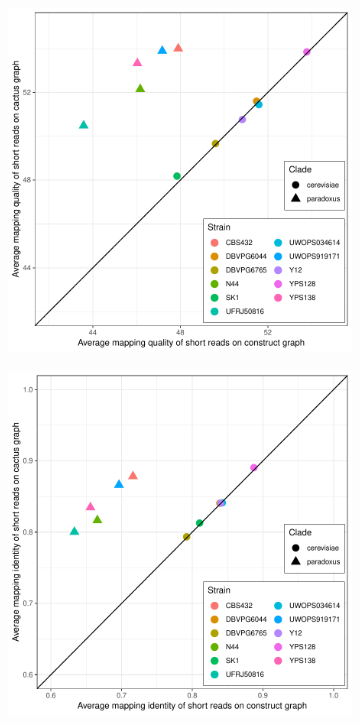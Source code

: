 \documentclass{article}
\begin{document}
\clearpage
\begin{figure}
  \begin{subfigure}[b]{.5\textwidth}
    \caption{}
    \includegraphics[width=\textwidth]{pdf/yeast-genotyping-quality.pdf}
  \end{subfigure}
  \begin{subfigure}[b]{.5\textwidth}
    \caption{}
    \includegraphics[width=\textwidth]{pdf/yeast-genotyping-identity.pdf}
  \end{subfigure}
\end{figure}
\end{document}
